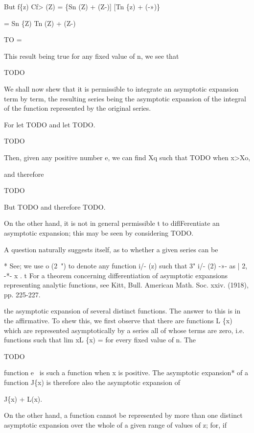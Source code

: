 But f\{z) Cf> (Z) = \{Sn (Z) + (Z-)] [Tn \{z) + (-»)\}

= Sn \{Z) Tn (Z) + (Z-)

TO =

This result being true for any fixed value of n, we see that

TODO


We shall now shew that it is permissible to integrate an asymptotic
expansion term by term, the resulting series being the asymptotic
expansion of the integral of the function represented by the original
series.

For let TODO and let TODO.

TODO

Then, given any positive number e, we can find Xq such that TODO when
x>Xo,

and therefore

TODO

But TODO and therefore TODO.

On the other hand, it is not in general permissible t to
diflFerentiate an asymptotic expansion; this may be seen by
considering TODO.


A question naturally suggests itself, as to whether a given series can
be

* See; we use o (2~") to denote any function i/- (z) such that
3" i/- (2) -»- as | 2, -*- x . t For a theorem concerning
differentiation of asymptotic expansions representing analytic
functions, see Kitt, Bull. American Math. Soc. xxiv. (1918), pp.
225-227.

%
%

the asymptotic expansion of several distinct functions. The answer to
this is in the affirmative. To shew this, we first observe that there
are functions L \{x) which are represented asymptotically by a series
all of whose terms are zero, i.e. functions such that lim xL \{x) =
for every fixed value of n. The

TODO

function e~ is such a function when x is positive. The asymptotic
expansion* of a function J\{x) is therefore also the asymptotic
expansion of

J\{x) + L(x).

On the other hand, a function cannot be represented by more than one
distinct asymptotic expansion over the whole of a given range of
values of z; for, if


